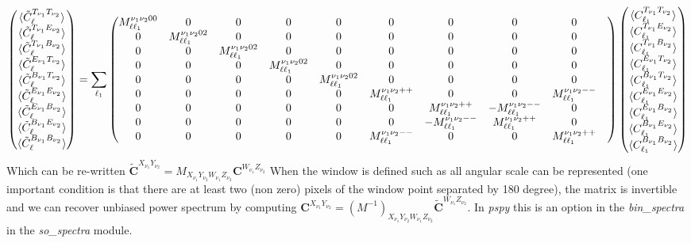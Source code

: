 \documentclass[a4paper, 11pt]{article}
\def\ba{\begin{eqnarray}}
\def\ea{\end{eqnarray}}
\begin{document}
\tiny
\ba
 \begin{pmatrix} \langle \tilde{C}^{T_{\nu_{1}}T_{\nu_{2}}}_{\ell} \rangle  \cr \langle \tilde{C}^{T_{\nu_{1}}E_{\nu_{2}}}_{\ell} \rangle  \cr \langle \tilde{C}^{T_{\nu_{1}}B_{\nu_{2}}}_{\ell} \rangle  \cr \langle \tilde{C}^{E_{\nu_{1}}T_{\nu_{2}}}_{\ell} \rangle  \cr \langle \tilde{C}^{B_{\nu_{1}}T_{\nu_{2}}}_{\ell} \rangle  \cr \langle \tilde{C}^{E_{\nu_{1}}E_{\nu_{2}}}_{\ell} \rangle  \cr \langle \tilde{C}^{E_{\nu_{1}}B_{\nu_{2}}}_{\ell} \rangle \cr  \langle \tilde{C}^{B_{\nu_{1}}E_{\nu_{2}}}_{\ell} \rangle \cr \langle \tilde{C}^{B_{\nu_{1}}B_{\nu_{2}}}_{\ell} \rangle \end{pmatrix} = \sum_{\ell_{1}}
\begin{pmatrix} 
M^{\nu_{1}\nu_{2}00}_{\ell \ell_{1}} & 
0 &
0 &
0 &
0 &
0 &
0 &
0 &
0 &
\cr
0 &
M^{\nu_{1}\nu_{2}02}_{\ell \ell_{1}} & 
0 &
0 &
0 &
0 &
0 &
0 &
0 &
\cr
0 &
0 & 
M^{\nu_{1}\nu_{2}02}_{\ell \ell_{1}} &
0 &
0 &
0 &
0 &
0 &
0 &
\cr
0 &
0 & 
0 &
M^{\nu_{1}\nu_{2}02}_{\ell \ell_{1}} &
0 &
0 &
0 &
0 &
0 &
\cr
0 &
0 & 
0 &
0 &
M^{\nu_{1}\nu_{2}02}_{\ell \ell_{1}} &
0 &
0 &
0 &
0 &
\cr
0 &
0 &
0 &
0 &
0 &
M^{\nu_{1}\nu_{2}++}_{\ell \ell_{1}} & 
0 &
0 &
M^{\nu_{1}\nu_{2}--}_{\ell \ell_{1}} &
\cr
0 &
0 &
0 &
0 &
0 &
0 & 
M^{\nu_{1}\nu_{2}++}_{\ell \ell_{1}} &
-M^{\nu_{1}\nu_{2}--}_{\ell \ell_{1}} &
0 &
\cr
0 &
0 &
0 &
0 &
0 &
0& 
-M^{\nu_{1}\nu_{2}--}_{\ell \ell_{1}}  &
M^{\nu_{1}\nu_{2}++}_{\ell \ell_{1}}  &
0&
\cr
0 &
0 &
0 &
0 &
0 &
M^{\nu_{1}\nu_{2}--}_{\ell \ell_{1}} & 
0 &
0 &
M^{\nu_{1}\nu_{2}++}_{\ell \ell_{1}} &
\end{pmatrix}
\begin{pmatrix} \langle C^{T_{\nu_{1}}T_{\nu_{2}}}_{\ell_{1}} \rangle  \cr \langle C^{T_{\nu_{1}}E_{\nu_{2}}}_{\ell_{1}} \rangle  \cr \langle C^{T_{\nu_{1}}B_{\nu_{2}}}_{\ell_{1}} \rangle  \cr \langle C^{E_{\nu_{1}}T_{\nu_{2}}}_{\ell_{1}} \rangle  \cr \langle C^{B_{\nu_{1}}T_{\nu_{2}}}_{\ell_{1}} \rangle  \cr \langle C^{E_{\nu_{1}}E_{\nu_{2}}}_{\ell_{1}} \rangle  \cr \langle C^{E_{\nu_{1}}B_{\nu_{2}}}_{\ell_{1}} \rangle \cr  \langle C^{B_{\nu_{1}}E_{\nu_{2}}}_{\ell_{1}} \rangle \cr \langle C^{B_{\nu_{1}}B_{\nu_{2}}}_{\ell_{1}} \rangle \end{pmatrix}\ea
\normalsize
Which can be re-written $\bm{\tilde{C}}^{X_{\nu_{1}}Y_{\nu_{2}}}= M_{X_{\nu_{1}}Y_{\nu_{2}} W_{\nu_{1}}Z_{\nu_{2}}} \bm{C}^{W_{\nu_{1}}Z_{\nu_{2}}}$
When the window is defined such as all angular scale can be represented (one important condition is that there are at least two (non zero) pixels of the window point separated by 180 degree), the matrix is invertible and we can recover unbiased power spectrum by computing $\bm{C}^{X_{\nu_{1}}Y_{\nu_{2}}}= (M^{-1})_{X_{\nu_{1}}Y_{\nu_{2}} W_{\nu_{1}}Z_{\nu_{2}}} \bm{\tilde{C}}^{W_{\nu_{1}}Z_{\nu_{2}}}$. In   {\it pspy} this is an option in the {\it bin\_spectra} in the {\it so\_spectra} module.
\end{document}
